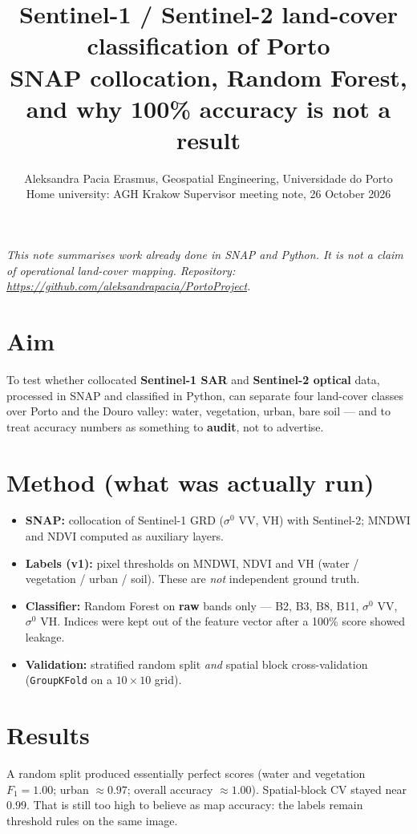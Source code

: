 \documentclass[11pt,a4paper]{article}
\title{\textbf{Sentinel-1 / Sentinel-2 land-cover classification of Porto}\\[0.35em]
\large SNAP collocation, Random Forest, and why 100\% accuracy is not a result}
\author{Aleksandra Pacia \quad Erasmus, Geospatial Engineering, Universidade do Porto\\
{\small Home university: AGH Krakow \quad Supervisor meeting note, 26 October 2026}}
\date{}
\begin{document}
\maketitle
\vspace{-1.4em}

\noindent\textit{This note summarises work already done in SNAP and Python. It is not a claim of operational land-cover mapping. Repository: \url{https://github.com/aleksandrapacia/PortoProject}.}

\section{Aim}
To test whether collocated \textbf{Sentinel-1 SAR} and \textbf{Sentinel-2 optical} data, processed in SNAP and classified in Python, can separate four land-cover classes over Porto and the Douro valley: water, vegetation, urban, bare soil --- and to treat accuracy numbers as something to \textbf{audit}, not to advertise.

\section{Method (what was actually run)}
\begin{itemize}
  \item \textbf{SNAP:} collocation of Sentinel-1 GRD ($\sigma^0$ VV, VH) with Sentinel-2; MNDWI and NDVI computed as auxiliary layers.
  \item \textbf{Labels (v1):} pixel thresholds on MNDWI, NDVI and VH (water / vegetation / urban / soil). These are \emph{not} independent ground truth.
  \item \textbf{Classifier:} Random Forest on \textbf{raw} bands only --- B2, B3, B8, B11, $\sigma^0$ VV, $\sigma^0$ VH. Indices were kept out of the feature vector after a 100\% score showed leakage.
  \item \textbf{Validation:} stratified random split \emph{and} spatial block cross-validation (\texttt{GroupKFold} on a $10\times10$ grid).
\end{itemize}

\section{Results}
A random split produced essentially perfect scores (water and vegetation $F_1 = 1.00$; urban $\approx 0.97$; overall accuracy $\approx 1.00$). Spatial-block CV stayed near $0.99$. That is still too high to believe as map accuracy: the labels remain threshold rules on the same image.
\end{document}
